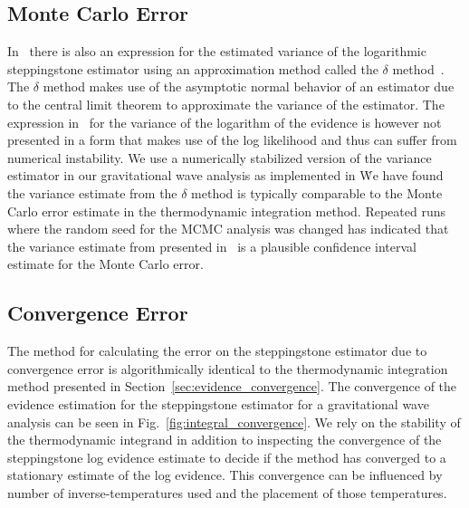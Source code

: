 \subsection{Monte Carlo Error}
In~\cite{xie2010improving} there is also an expression for the estimated variance of the logarithmic steppingstone estimator using an approximation method called the $\delta$ method~\citep{oehlert1992note}. The $\delta$ method makes use of the asymptotic normal behavior of an estimator due to the central limit theorem to approximate the variance of the estimator. The expression in~\cite{xie2010improving} for the variance of the logarithm of the evidence is however not presented in a form that makes use of the log likelihood and thus can suffer from numerical instability. We use a numerically stabilized version of the variance estimator in our gravitational wave analysis as implemented in \pycbc{}\. We have found the variance estimate from the $\delta$ method is typically comparable to the Monte Carlo error estimate in the thermodynamic integration method. Repeated runs where the random seed for the MCMC analysis was changed has indicated that the variance estimate from presented in~\cite{xie2010improving} is a plausible confidence interval estimate for the Monte Carlo error. 

\subsection{Convergence Error}
The method for calculating the error on the steppingstone estimator due to convergence error is algorithmically identical to the thermodynamic integration method presented in Section~\ref{sec:evidence_convergence}. The convergence of the evidence estimation for the steppingstone estimator for a gravitational wave analysis can be seen in Fig.~\ref{fig:integral_convergence}. We rely on the stability of the thermodynamic integrand in addition to inspecting the convergence of the steppingstone log evidence estimate to decide if the method has converged to a stationary estimate of the log evidence. This convergence can be influenced by number of inverse-temperatures used and the placement of those temperatures.

